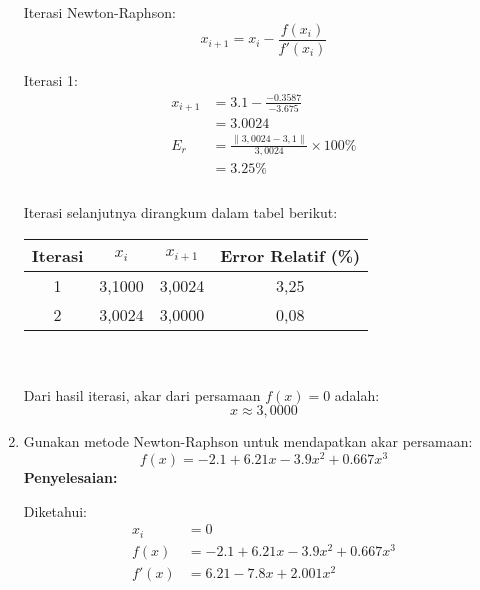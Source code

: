 \documentclass{article}
\newcommand{\penyelesaian}{\textbf{Penyelesaian: }}
\begin{document}
\begin{enumerate}
    Iterasi Newton-Raphson: \\
    \begin{equation*}
        x_{i+1} = x_i - \frac{f(x_i)}{f'(x_i)}
    \end{equation*}

    Iterasi 1: \\
    \begin{equation*}
    \begin{split}
        x_{i+1} & = \num{3,1} - \frac{-\num{0,3587}}{-\num{3,675}} \\
        & = \num{3,0024} \\
        E_r & = \frac{\|3,0024 - 3,1\|}{3,0024} \times 100\% \\
        & = \num{3,25}\% \\
    \end{split}
    \end{equation*} \\

    Iterasi selanjutnya dirangkum dalam tabel berikut: 
    \begin{table}[h]
        \centering
        \begin{tabular}{cccc}
            \toprule
            Iterasi & $x_i$ & $x_{i+1}$ & Error Relatif (\%) \\
            \midrule
            1 & 3,1000 & 3,0024 & 3,25 \\
            2 & 3,0024 & 3,0000 & 0,08 \\
            \bottomrule
        \end{tabular}
        \label{tab:iterasi}
    \end{table} \\ \\

    Dari hasil iterasi, akar dari persamaan $f(x) = 0$ adalah: \\
    \begin{equation}
        x \approx 3,0000
    \end{equation}

    \item Gunakan metode Newton-Raphson untuk mendapatkan akar persamaan: \\
    \begin{equation*}
        f(x) = -\num{2,1} + \num{6,21}x - \num{3,9}x^2 + \num{0,667}x^3
    \end{equation*}
    \penyelesaian

    Diketahui: \\
    \begin{equation*}
    \begin{split}
        x_i & = 0 \\
        f(x) & = -\num{2,1} + \num{6,21}x - \num{3,9}x^2 + \num{0,667}x^3 \\
        f'(x) & = \num{6,21} - \num{7,8}x + \num{2,001}x^2
    \end{split}
    \end{equation*}


\end{enumerate}
\end{document}
